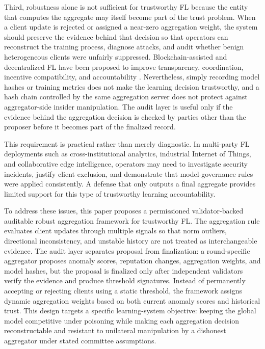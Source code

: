 \documentclass[preprint,12pt]{elsarticle}
\begin{document}
Third, robustness alone is not sufficient for trustworthy FL because the entity that computes the aggregate may itself become part of the trust problem. When a client update is rejected or assigned a near-zero aggregation weight, the system should preserve the evidence behind that decision so that operators can reconstruct the training process, diagnose attacks, and audit whether benign heterogeneous clients were unfairly suppressed. Blockchain-assisted and decentralized FL have been proposed to improve transparency, coordination, incentive compatibility, and accountability \citep{lu2020blockchain,nguyen2021blockchainedge,dong2024blockchain,zhang2024bitfl,ren2024bpfl,awan2022blockchainflsurvey,yuan2024dflsurvey,jiang2023blockflsurvey}. Nevertheless, simply recording model hashes or training metrics does not make the learning decision trustworthy, and a hash chain controlled by the same aggregation server does not protect against aggregator-side insider manipulation. The audit layer is useful only if the evidence behind the aggregation decision is checked by parties other than the proposer before it becomes part of the finalized record.

This requirement is practical rather than merely diagnostic. In multi-party FL deployments such as cross-institutional analytics, industrial Internet of Things, and collaborative edge intelligence, operators may need to investigate security incidents, justify client exclusion, and demonstrate that model-governance rules were applied consistently. A defense that only outputs a final aggregate provides limited support for this type of trustworthy learning accountability.

To address these issues, this paper proposes a permissioned validator-backed auditable robust aggregation framework for trustworthy FL. The aggregation rule evaluates client updates through multiple signals so that norm outliers, directional inconsistency, and unstable history are not treated as interchangeable evidence. The audit layer separates proposal from finalization: a round-specific aggregator proposes anomaly scores, reputation changes, aggregation weights, and model hashes, but the proposal is finalized only after independent validators verify the evidence and produce threshold signatures. Instead of permanently accepting or rejecting clients using a static threshold, the framework assigns dynamic aggregation weights based on both current anomaly scores and historical trust. This design targets a specific learning-system objective: keeping the global model competitive under poisoning while making each aggregation decision reconstructable and resistant to unilateral manipulation by a dishonest aggregator under stated committee assumptions.
\end{document}
